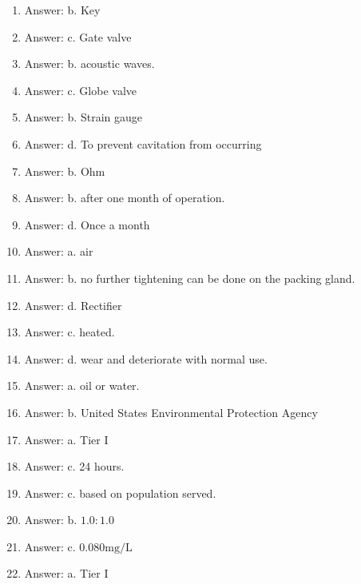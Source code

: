 \documentclass[10pt]{article}
\begin{document}
\begin{enumerate}
  \item Answer: b. Key

  \item Answer: c. Gate valve

  \item Answer: b. acoustic waves.

  \item Answer: c. Globe valve

  \item Answer: b. Strain gauge

  \item Answer: d. To prevent cavitation from occurring

  \item Answer: b. Ohm

  \item Answer: b. after one month of operation.

  \item Answer: d. Once a month

  \item Answer: a. air

  \item Answer: b. no further tightening can be done on the packing gland.

  \item Answer: d. Rectifier

  \item Answer: c. heated.

  \item Answer: d. wear and deteriorate with normal use.

  \item Answer: a. oil or water.

  \item Answer: b. United States Environmental Protection Agency

  \item Answer: a. Tier I

  \item Answer: c. 24 hours.

  \item Answer: c. based on population served.

  \item Answer: b. $1.0: 1.0$

  \item Answer: c. $0.080 \mathrm{mg} / \mathrm{L}$

  \item Answer: a. Tier I


\end{enumerate}
\end{document}
